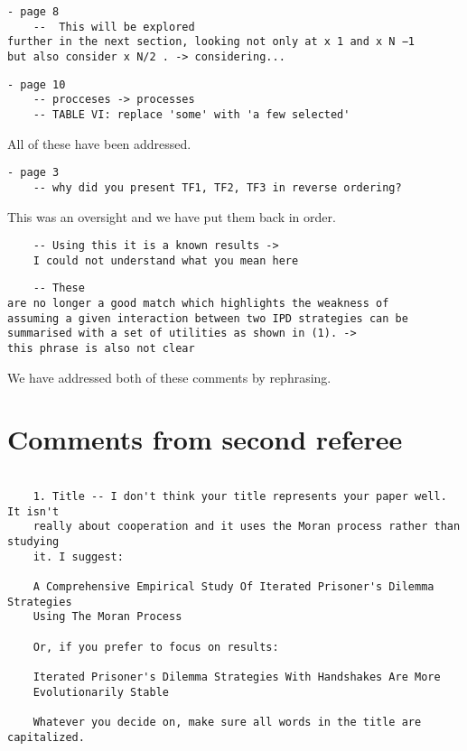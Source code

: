 \documentclass[a4]{article}
\begin{document}
\begin{verbatim}
- page 8
	--  This will be explored
further in the next section, looking not only at x 1 and x N −1
but also consider x N/2 . -> considering...
\end{verbatim}

\begin{verbatim}
- page 10
	-- procceses -> processes
	-- TABLE VI: replace 'some' with 'a few selected'
\end{verbatim}

All of these have been addressed. 

\begin{verbatim}
- page 3
	-- why did you present TF1, TF2, TF3 in reverse ordering?
\end{verbatim}

This was an oversight and we have put them back in order.

\begin{verbatim}
	-- Using this it is a known results -> 
    I could not understand what you mean here
\end{verbatim}

\begin{verbatim}
	-- These
are no longer a good match which highlights the weakness of
assuming a given interaction between two IPD strategies can be
summarised with a set of utilities as shown in (1). -> 
this phrase is also not clear
\end{verbatim}

We have addressed both of these comments by rephrasing.

\section{Comments from second referee}

\begin{verbatim}

    1. Title -- I don't think your title represents your paper well. It isn't
    really about cooperation and it uses the Moran process rather than studying
    it. I suggest: 

    A Comprehensive Empirical Study Of Iterated Prisoner's Dilemma Strategies
    Using The Moran Process

    Or, if you prefer to focus on results:

    Iterated Prisoner's Dilemma Strategies With Handshakes Are More
    Evolutionarily Stable

    Whatever you decide on, make sure all words in the title are capitalized.

\end{verbatim}
\end{document}
